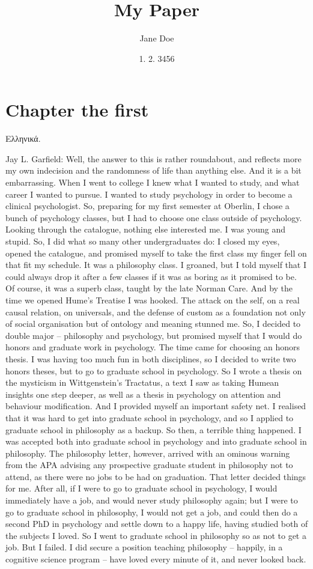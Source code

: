 \documentclass[article,letterpaper,times,12pt,listings-bw,microtype]{memoir}
\author{Jane Doe}
\date{1. 2. 3456}
\title{My Paper}
\begin{document}
\maketitle


\section{Chapter the first}
\label{sec-1}

Ελληνικά. 

Jay L. Garfield: Well, the answer to this is rather roundabout, and reflects more my own indecision and the randomness of life than anything else. And it is a bit embarrassing. When I went to college I knew what I wanted to study, and what career I wanted to pursue. I wanted to study psychology in order to become a clinical psychologist. So, preparing for my first semester at Oberlin, I chose a bunch of psychology classes, but I had to choose one class outside of psychology. Looking through the catalogue, nothing else interested me. I was young and stupid. So, I did what so many other undergraduates do: I closed my eyes, opened the catalogue, and promised myself to take the first class my finger fell on that fit my schedule. It was a philosophy class. I groaned, but I told myself that I could always drop it after a few classes if it was as boring as it promised to be. Of course, it was a superb class, taught by the late Norman Care. And by the time we opened Hume’s Treatise I was hooked. The attack on the self, on a real causal relation, on universals, and the defense of custom as a foundation not only of social organisation but of ontology and meaning stunned me. So, I decided to double major – philosophy and psychology, but promised myself that I would do honors and graduate work in psychology. The time came for choosing an honors thesis. I was having too much fun in both disciplines, so I decided to write two honors theses, but to go to graduate school in psychology. So I wrote a thesis on the mysticism in Wittgenstein’s Tractatus, a text I saw as taking Humean insights one step deeper, as well as a thesis in psychology on attention and behaviour modification. And I provided myself an important safety net. I realised that it was hard to get into graduate school in psychology, and so I applied to graduate school in philosophy as a backup. So then, a terrible thing happened. I was accepted both into graduate school in psychology and into graduate school in philosophy. The philosophy letter, however, arrived with an ominous warning from the APA advising any prospective graduate student in philosophy not to attend, as there were no jobs to be had on graduation. That letter decided things for me. After all, if I were to go to graduate school in psychology, I would immediately have a job, and would never study philosophy again; but I were to go to graduate school in philosophy, I would not get a job, and could then do a second PhD in psychology and settle down to a happy life, having studied both of the subjects I loved. So I went to graduate school in philosophy so as not to get a job. But I failed. I did secure a position teaching philosophy – happily, in a cognitive science program – have loved every minute of it, and never looked back.
\end{document}

